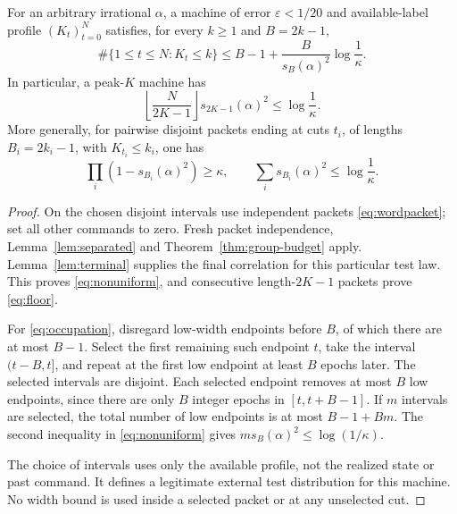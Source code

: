 \begin{theorem}\label{thm:occupation}
For an arbitrary irrational $\alpha$, a machine of error
$\varepsilon<1/20$ and available-label profile $(K_t)_{t=0}^N$ satisfies,
for every $k\ge1$ and $B=2k-1$,
\begin{equation}\label{eq:occupation}
 \#\{1\le t\le N:K_t\le k\}
 \le B-1+\frac{B}{s_B(\alpha)^2}\log\frac1\kappa.
\end{equation}
In particular, a peak-$K$ machine has
\begin{equation}\label{eq:floor}
 \left\lfloor\frac N{2K-1}\right\rfloor
               s_{2K-1}(\alpha)^2\le\log\frac1\kappa.
\end{equation}
More generally, for pairwise disjoint packets ending at cuts $t_i$, of
lengths $B_i=2k_i-1$, with $K_{t_i}\le k_i$, one has
\begin{equation}\label{eq:nonuniform}
 \prod_i(1-s_{B_i}(\alpha)^2)\ge\kappa,
 \qquad \sum_i s_{B_i}(\alpha)^2\le\log\frac1\kappa.
\end{equation}
\end{theorem}
\begin{proof}
On the chosen disjoint intervals use independent packets
\eqref{eq:wordpacket}; set all other commands to zero. Fresh packet
independence, Lemma~\ref{lem:separated} and Theorem~\ref{thm:group-budget}
apply. Lemma~\ref{lem:terminal} supplies the final correlation for this
particular test law. This proves \eqref{eq:nonuniform}, and consecutive
length-$2K-1$ packets prove \eqref{eq:floor}.

For \eqref{eq:occupation}, disregard low-width endpoints before $B$,
of which there are at most $B-1$. Select the first remaining such endpoint
$t$, take the interval $(t-B,t]$, and repeat at the first low endpoint
at least $B$ epochs later. The selected intervals are disjoint. Each
selected endpoint removes at most $B$ low endpoints, since there are
only $B$ integer epochs in $[t,t+B-1]$. If $m$ intervals are selected,
the total number of low endpoints is at most $B-1+Bm$. The second
inequality in \eqref{eq:nonuniform} gives
$m s_B(\alpha)^2\le\log(1/\kappa)$.

The choice of intervals uses only the available profile, not the
realized state or past command. It defines a legitimate external test
distribution for this machine. No width bound is used inside a selected
packet or at any unselected cut.
\end{proof}

